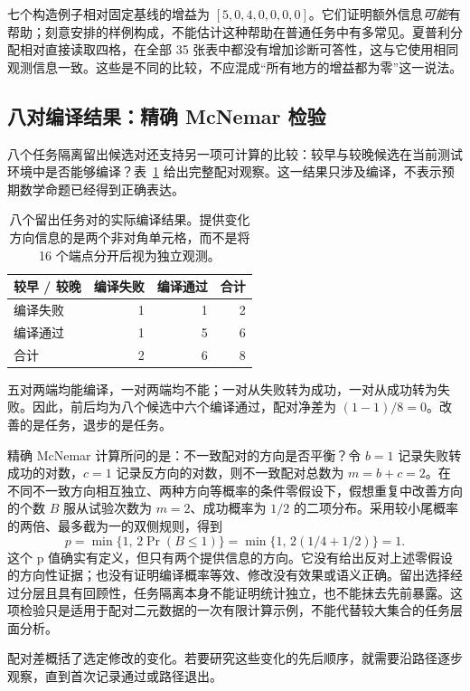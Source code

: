 七个构造例子相对固定基线的增益为 $[5,0,4,0,0,0,0]$。它们证明额外信息\emph{可能}有帮助；刻意安排的样例构成，不能估计这种帮助在普通任务中有多常见。夏普利分配相对直接读取四格，在全部 35 张表中都没有增加诊断可答性，这与它使用相同观测信息一致。这些是不同的比较，不应混成“所有地方的增益都为零”这一说法。

\subsection{八对编译结果：精确 McNemar 检验}
\label{subsec:mcnemar}
八个任务隔离留出候选对还支持另一项可计算的比较：较早与较晚候选在当前测试环境中是否能够编译？表~\ref{tab:compile-pairs} 给出完整配对观察。这一结果只涉及编译，不表示预期数学命题已经得到正确表达。

\begin{table}[htbp]
\centering\small
\caption{八个留出任务对的实际编译结果。提供变化方向信息的是两个非对角单元格，而不是将 16 个端点分开后视为独立观测。}
\label{tab:compile-pairs}
\begin{tabular}{lrrr}
\toprule
较早 / 较晚 & 编译失败 & 编译通过 & 合计 \\
\midrule
编译失败 & 1 & 1 & 2 \\
编译通过 & 1 & 5 & 6 \\
\midrule
合计 & 2 & 6 & 8 \\
\bottomrule
\end{tabular}
\end{table}

五对两端均能编译，一对两端均不能；一对从失败转为成功，一对从成功转为失败。因此，前后均为八个候选中六个编译通过，配对净差为 $(1-1)/8=0$。改善的是任务，退步的是任务。

精确 McNemar 计算所问的是：不一致配对的方向是否平衡\cite{nistmcnemar}？令 $b=1$ 记录失败转成功的对数，$c=1$ 记录反方向的对数，则不一致配对总数为 $m=b+c=2$。在不同不一致方向相互独立、两种方向等概率的条件零假设下，假想重复中改善方向的个数 $B$ 服从试验次数为 $m=2$、成功概率为 $1/2$ 的二项分布。采用较小尾概率的两倍、最多截为一的双侧规则，得到
\[
p=\min\{1,\,2\Pr(B\leq1)\}
=\min\{1,\,2(1/4+1/2)\}=1.
\]
这个 p 值确实有定义，但只有两个提供信息的方向。它没有给出反对上述零假设的方向性证据；也没有证明编译概率等效、修改没有效果或语义正确。留出选择经过分层且具有回顾性，任务隔离本身不能证明统计独立，也不能抹去先前暴露。这项检验只是适用于配对二元数据的一次有限计算示例，不能代替较大集合的任务层面分析。

配对差概括了选定修改的变化。若要研究这些变化的先后顺序，就需要沿路径逐步观察，直到首次记录通过或路径退出。
